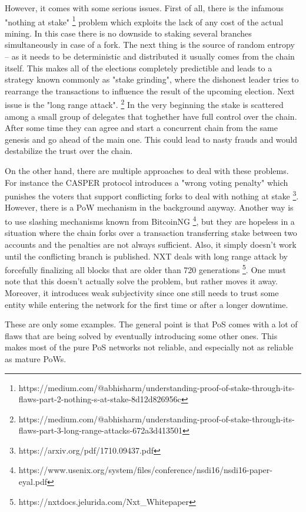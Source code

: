 However, it comes with some serious issues. First of all, there is the infamous "nothing at stake"
\footnote{https://medium.com/@abhisharm/understanding-proof-of-stake-through-its-flaws-part-2-nothing-s-at-stake-8d12d826956c}
problem which exploits the lack of any cost of the actual mining. In this case
there is no downside to staking several branches simultaneously in case of a fork.
The next thing is the source of random entropy – as it needs to be deterministic
and distributed it usually comes from the chain itself. This
makes all of the elections completely predictible and leads to a strategy known
commonly as "stake grinding", where the dishonest leader tries to rearrange the
transactions to influence the result of the upcoming election. Next issue is the
"long range attack".
\footnote{https://medium.com/@abhisharm/understanding-proof-of-stake-through-its-flaws-part-3-long-range-attacks-672a3d413501}
In the very beginning the stake is scattered among a small
group of delegates that toghether have full control over the chain. After
some time they can agree and start a concurrent chain from the same genesis
and go ahead of the main one. This could lead to nasty frauds and would
destabilize the trust over the chain.

On the other hand, there are multiple approaches to deal with these problems. For instance
the CASPER protocol introduces a "wrong voting penalty" which punishes the
voters that support conflicting forks to deal with nothing at stake
\footnote{https://arxiv.org/pdf/1710.09437.pdf}.
However, there is a PoW mechanism in the background anyway. Another way is to use
slashing mechanisms known from BitcoinNG
\footnote{https://www.usenix.org/system/files/conference/nsdi16/nsdi16-paper-eyal.pdf},
but they are hopeless in a situation where the chain forks over a transaction
transferring stake between two accounts and the penalties are not always
sufficient. Also, it simply doesn't work until the
conflicting branch is published. NXT deals with long range attack by forcefully
finalizing all blocks that are older than 720 generations
\footnote{https://nxtdocs.jelurida.com/Nxt\_Whitepaper}.
One must note that this doesn't actually solve the problem, but rather moves it
away. Moreover, it introduces weak subjectivity since one still needs to trust
some entity while entering the network for the first time or after a longer downtime.

These are only some examples. The general point is that PoS comes with a lot
of flaws that are being solved by eventually introducing some other ones. This
makes most of the pure PoS networks not reliable, and especially not as reliable
as mature PoWs.
